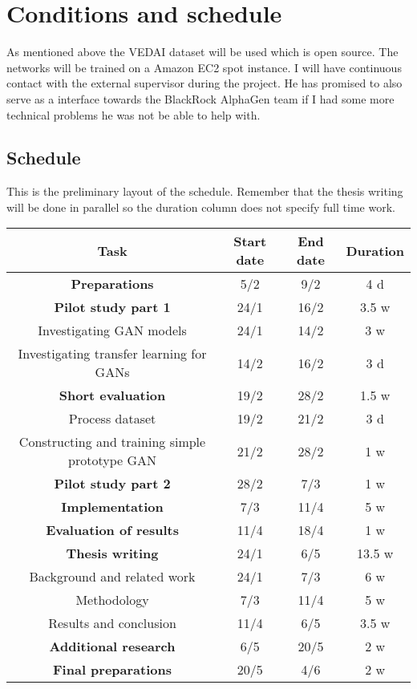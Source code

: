 \documentclass[a4paper,11pt]{article}
\begin{document}
\section{Conditions and schedule}
As mentioned above the VEDAI dataset will be used which is open source. The networks will be trained on a Amazon EC2 spot instance. I will have continuous contact with the external supervisor during the project. He has promised to also serve as a interface towards the BlackRock AlphaGen team if I had some more technical problems he was not be able to help with.
\newpage
\subsection{Schedule}
This is the preliminary layout of the schedule. Remember that the thesis writing will be done in parallel so the duration column does not specify full time work.
\begin{center}
\begin{tabular}{|c|c|c|c|}
\hline
\textbf{Task} & \textbf{Start date} & \textbf{End date} & \textbf{Duration}\\
\hline
\textbf{Preparations} & 5/2 &  9/2 & 4 d\\
\hline
\textbf{Pilot study part 1} & 24/1 & 16/2 & 3.5 w\\
Investigating GAN models & 24/1 & 14/2  & 3 w\\
Investigating transfer learning for GANs  & 14/2 & 16/2 & 3 d\\
\hline
\textbf{Short evaluation} & 19/2 & 28/2 & 1.5 w\\
Process dataset & 19/2 & 21/2 & 3 d\\
Constructing and training simple prototype GAN & 21/2 & 28/2 & 1 w\\
\hline
\textbf{Pilot study part 2} & 28/2 & 7/3 & 1 w\\
\hline
\textbf{Implementation} & 7/3 & 11/4 & 5 w \\
\hline
\textbf{Evaluation of results} & 11/4 & 18/4 & 1 w\\
\hline
\textbf{Thesis writing} & 24/1 & 6/5 & 13.5 w\\
Background and related work & 24/1 & 7/3 & 6 w\\
Methodology & 7/3 & 11/4 & 5 w\\
Results and conclusion & 11/4 & 6/5 & 3.5 w\\
\hline
\textbf{Additional research} & 6/5 & 20/5 & 2 w\\
\hline
\textbf{Final preparations} & 20/5 & 4/6 & 2 w\\
\hline
\end{tabular}
\end{center}
\newpage
\end{document}
